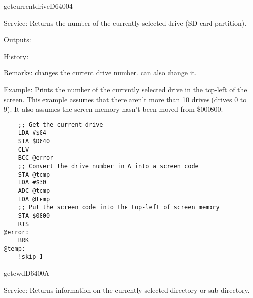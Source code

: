 \newpage
\begin{hyppotrap}{getcurrentdrive}{D640}{04}
\item [Service:]
  Returns the number of the currently selected drive (SD card partition).
\item [Outputs:]
\item [History:]
\item [Remarks:]
   changes the current drive number. 
  can also change it.
\item [Example:]
  Prints the number of the currently selected drive in the top-left of the
  screen. This example assumes that there aren't more than 10 drives (drives
  0 to 9). It also assumes the screen memory hasn't been moved from \$000800.
\begin{tcolorbox}[colback=black,coltext=white]
\verbatimfont{\codefont}
\begin{verbatim}
    ;; Get the current drive
    LDA #$04
    STA $D640
    CLV
    BCC @error
    ;; Convert the drive number in A into a screen code
    STA @temp
    LDA #$30
    ADC @temp
    LDA @temp
    ;; Put the screen code into the top-left of screen memory
    STA $0800
    RTS
@error:
    BRK
@temp:
    !skip 1
\end{verbatim}
\end{tcolorbox}
\end{hyppotrap}


\newpage
\begin{hyppotrap}{getcwd}{D640}{0A}
\item [Service:]
  Returns information on the currently selected directory or sub-directory.
\notimplemented
\end{hyppotrap}


